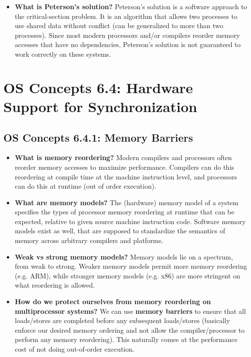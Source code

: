 \documentclass[12pt]{article}
\begin{document}
\begin{itemize}
    \item \textbf{What is Peterson's solution?} Peterson's solution is a software approach to the critical-section problem. It is an algorithm that allows two processes to use shared data without conflict (can be generalized to more than two processes). Since most modern processors and/or compilers reorder memory accesses that have no dependencies, Peterson's solution is not guaranteed to work correctly on these systems.
\end{itemize}

\section*{OS Concepts 6.4: Hardware Support for Synchronization}

\subsection*{OS Concepts 6.4.1: Memory Barriers}

\begin{itemize}
    \item \textbf{What is memory reordering?} Modern compilers and processors often reorder memory accesses to maximize performance. Compilers can do this reordering at compile time at the machine instruction level, and processors can do this at runtime (out of order execution).
    \item \textbf{What are memory models?} The (hardware) memory model of a system specifies the types of processor memory reordering at runtime that can be expected, relative to given source machine instruction code. Software memory models exist as well, that are supposed to standardize the semantics of memory across arbitrary compilers and platforms.
    \item \textbf{Weak vs strong memory models?} Memory models lie on a spectrum, from weak to strong. Weaker memory models permit more memory reordering (e.g. ARM), while stronger memory models (e.g. x86) are more stringent on what reordering is allowed.
    \item \textbf{How do we protect ourselves from memory reordering on multiprocessor systems?} We can use \textbf{memory barriers} to ensure that all loads/stores are completed before any subsequent loads/stores (basically enforce our desired memory ordering and not allow the compiler/processor to perform any memory reordering). This naturally comes at the performance cost of not doing out-of-order execution.
\end{itemize}
\end{document}
